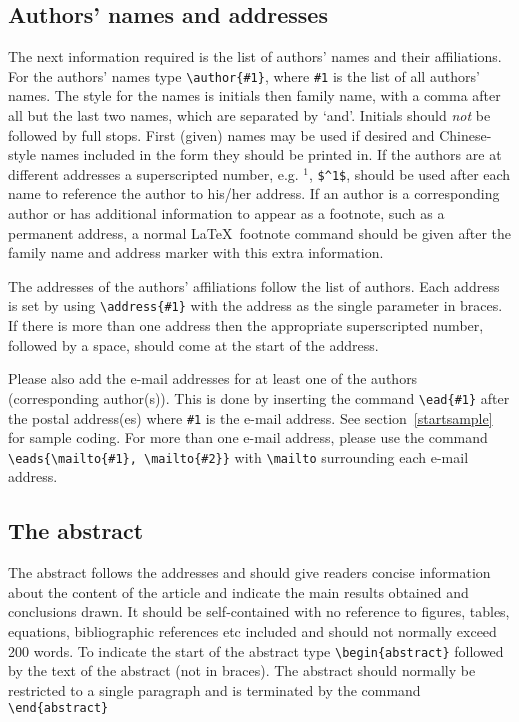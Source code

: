 \documentclass[12pt]{iopart}
\begin{document}
\subsection{Authors' names and addresses}
The next information required is the list of authors' names and 
their affiliations. For the authors' names type \verb"\author{#1}", 
where \verb"#1" is the 
list of all authors' names. The style for the names is initials then
family name, with a comma after all but the last 
two names, which are separated by `and'. Initials should {\it not} be followed by full stops. First (given) names may be used if 
desired and Chinese-style names included in the form they should be printed in. If the authors are at different addresses a superscripted number, e.g. $^1$, \verb"$^1$", should be used after each 
name to reference the author to his/her address. 
If an author is a corresponding author or has additional information to appear as a footnote, such as 
a permanent address, a normal \LaTeX\ footnote command
should be given after the family name and address marker 
with this extra information. 

The addresses of the authors' affiliations follow the list of authors. 
Each address is set by using
\verb"\address{#1}" with the address as the single parameter in braces. 
If there is more 
than one address then the appropriate superscripted number, followed by a space, should come at the start of
the address.
 
Please also add the e-mail addresses for at least one of the authors (corresponding author(s)). This is done by inserting the 
command \verb"\ead{#1}" after the postal address(es) where \verb"#1" is the e-mail address.  
See section~\ref{startsample} for sample coding. For more than one e-mail address, please use the command 
\verb"\eads{\mailto{#1}, \mailto{#2}}" with \verb"\mailto" surrounding each e-mail address.

\subsection{The abstract}
The abstract follows the addresses and
should give readers concise information about the content 
of the article and indicate the main results obtained and conclusions 
drawn. It should be self-contained with no reference to 
figures, tables, equations, bibliographic references etc
included and should not normally exceed 200 
words.
To indicate the start 
of the abstract type \verb"\begin{abstract}" followed by the text of the 
abstract (not in braces).  The abstract should normally be restricted 
to a single paragraph and is terminated by the command
\verb"\end{abstract}"
\end{document}
